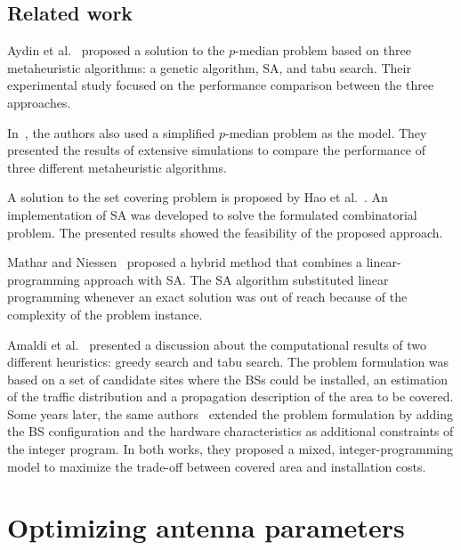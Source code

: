 \subsection*{Related work}

Aydin et al.~\cite{Aydin:Heuristic.Optimization.Of.WCDMA} proposed
a solution to the $p$-median problem based on three metaheuristic
algorithms: a genetic algorithm, SA, and tabu search. Their experimental
study focused on the performance comparison between the three approaches.

In~\cite{Yang-UMTS_base_station_location_planning:2007}, the authors
also used a simplified $p$-median problem as the model. They presented
the results of extensive simulations to compare the performance of
three different metaheuristic algorithms.

A solution to the set covering problem is proposed by Hao et al.~\cite{minimum.set.covering.problem:1997}.
An implementation of SA was developed to solve the formulated combinatorial
problem. The presented results showed the feasibility of the proposed
approach. 

Mathar and Niessen~\cite{minimum.set.covering.problem:2000} proposed
a hybrid method that combines a linear-programming approach with SA.
The SA algorithm substituted linear programming whenever an exact
solution was out of reach because of the complexity of the problem
instance.

Amaldi et al.~\cite{Amaldi-Planning_UMTS_base_station_locations:2003}
presented a discussion about the computational results of two different
heuristics: greedy search and tabu search. The problem formulation
was based on a set of candidate sites where the BSs could be installed,
an estimation of the traffic distribution and a propagation description
of the area to be covered. Some years later, the same authors~\cite{Amaldi-Radio_planning_and_coverage_optimization_of_3G_networks:2008}
extended the problem formulation by adding the BS configuration and
the hardware characteristics as additional constraints of the integer
program. In both works, they proposed a mixed, integer-programming
model to maximize the trade-off between covered area and installation
costs.




\section{Optimizing antenna parameters}

